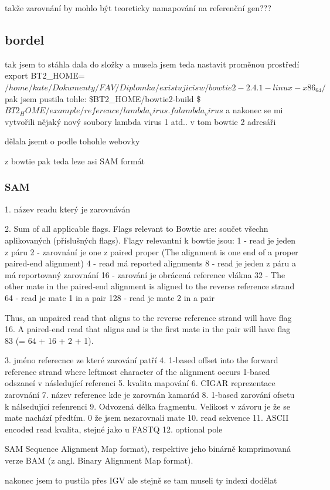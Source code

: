 \documentclass[czech,DP]{thesiskiv}
\begin{document}
takže zarovnání by mohlo být teoreticky namapování na referenční gen???

\subsection{bordel}
tak jsem  to stáhla dala do složky a musela jsem teda nastavit proměnou prostředí 
export BT2\_HOME=$/home/kate/Dokumenty/FAV/Diplomka/existujicisw/bowtie2-2.4.1-linux-x86_64/$
pak jsem pustila tohle: 
\$BT2\_HOME/bowtie2-build \$ $BT2_HOME/example/reference/lambda_virus.fa lambda_virus$
a nakonec se mi vytvořili nějaký nový soubory lambda virus 1 atd.. v tom bowtie 2 adresáři

dělala jsemt o podle tohohle webovky %


z bowtie pak teda leze asi SAM formát

\subsubsection{SAM}
1. název readu který je zarovnáván

2. Sum of all applicable flags. Flags relevant to Bowtie are:
součet všechn aplikovaných (příslušných flags). Flagy relevantní k bowtie jsou: 
1 - read je jeden z páru
2 - zarovnání je one z paired proper (The alignment is one end of a proper paired-end alignment)
4 - read má reported alignments
8 - read je jeden z páru a má reportovaný zarovnání
16 - zarování je obrácená reference vlákna
32 - The other mate in the paired-end alignment is aligned to the reverse reference strand
64 - read je mate 1 in a pair
128 - read je mate 2 in a pair

Thus, an unpaired read that aligns to the reverse reference strand will have flag 16. A paired-end read that aligns and is the first mate in the pair will have flag 83 (= 64 + 16 + 2 + 1).

3. jméno referecnce ze které zarování patří
4. 1-based offset into the forward reference strand where leftmost character of the alignment occurs 1-based odszaneí v následující referenci 
5. kvalita mapování
6. CIGAR reprezentace zarovnání
7. název reference kde je zarovnán kamarád 
8. 1-based zarování ofsetu k nálsedující refenrenci 
9. Odvozená délka fragmentu. Velikost v závoru je že se mate nachází předtím. 0 že jsem nezarovnali mate
10. read sekvence
11. ASCII encoded read kvalita, stejné jako u FASTQ
12. optional pole


SAM Sequence Alignment Map format), respektive jeho binárně
komprimovaná verze BAM (z angl. Binary Alignment Map format).

nakonec jsem to pustila přes IGV ale stejně se tam museli ty indexi dodělat


% 
%
\nocite{*}

{\raggedright\small

}
\end{document}
